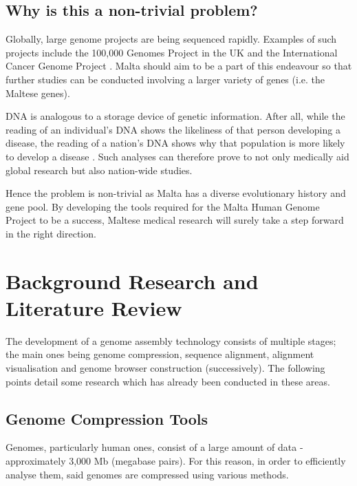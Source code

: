 \documentclass{csfyp}
\begin{document}
\subsection{Why is this a non-trivial problem?}\vspace{-2ex}

Globally, large genome projects are being sequenced rapidly.  Examples of such projects include the 100,000 Genomes Project in the UK and the International Cancer Genome Project \cite{bwtransform, refcompression, popgen}.  Malta should aim to be a part of this endeavour so that further studies can be conducted involving a larger variety of genes (i.e. the Maltese genes).  

DNA is analogous to a storage device of genetic information.  After all, while the reading of an individual's DNA shows the likeliness of that person developing a disease, the reading of a nation’s DNA shows why that population is more likely to develop a disease \cite{think}.  Such analyses can therefore prove to not only medically aid global research but also nation-wide studies.

Hence the problem is non-trivial as Malta has a diverse evolutionary history and gene pool.  By developing the tools required for the Malta Human Genome Project to be a success, Maltese medical research will surely take a step forward in the right direction.              


\section{Background Research and Literature Review}\vspace{-2ex}

The development of a genome assembly technology consists of multiple stages; the main ones being genome compression, sequence alignment, alignment visualisation and genome browser construction (successively).  The following points detail some research which has already been conducted in these areas.

\subsection{Genome Compression Tools}\vspace{-2ex}
Genomes, particularly human ones, consist of a large amount of data - approximately 3,000 Mb (megabase pairs).  For this reason, in order to efficiently analyse them, said genomes are compressed using various methods.  
\end{document}
